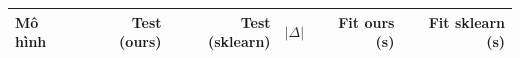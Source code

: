 \begin{tabular}{lrrrrr}
\toprule
Mô hình & Test (ours) & Test (sklearn) & $|\Delta|$ & Fit ours (s) & Fit sklearn (s) \\
\midrule
\bottomrule
\end{tabular}
